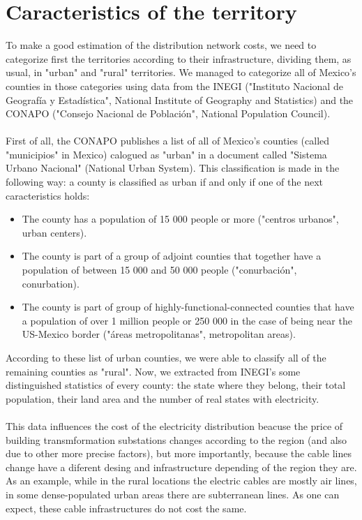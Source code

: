 \documentclass[•]{article}
\begin{document}
\section{Caracteristics of the territory}
To make a good estimation of the distribution network costs, we need to categorize first the territories according to their infrastructure, dividing them, as usual, in "urban" and "rural" territories. We managed to categorize all of Mexico's counties in those categories using data from the INEGI ("Instituto Nacional de Geografía y Estadística", National Institute of Geography and Statistics) and the CONAPO ("Consejo Nacional de Población", National Population Council).
\\
\\ First of all, the CONAPO publishes a list of all of Mexico's counties (called "municipios" in Mexico) calogued as "urban" in a document called "Sistema Urbano Nacional" (National Urban System)\cite{conapo}. This classification is made in the following way: a county is classified as urban if and only if one of the next caracteristics holds:
\begin{itemize}
\item The county has a population of 15 000 people or more ("centros urbanos", urban centers).
\item The county is part of a group of adjoint counties that together have a population of between 15 000 and 50 000 people ("conurbación", conurbation).
\item The county is part of group of highly-functional-connected counties that have a population of over 1 million people or 250 000 in the case of being near the US-Mexico border ("áreas metropolitanas", metropolitan areas).
\end{itemize}
According to these list of urban counties, we were able to classify all of the remaining counties as "rural". Now, we extracted from INEGI's  some distinguished statistics of every county: the state where they belong, their total population, their land area and the number of real states with electricity.\cite{inegi}
\\
\\This data influences the cost of the electricity distribution beacuse the price of building transmformation substations changes according to the region (and also due to other more precise factors), but more importantly, because the cable lines change have a diferent desing and infrastructure depending of the region they are. As an example, while in the rural locations the electric cables are mostly air lines, in some dense-populated urban areas there are subterranean lines. As one can expect, these cable infrastructures do not cost the same.
\end{document}
